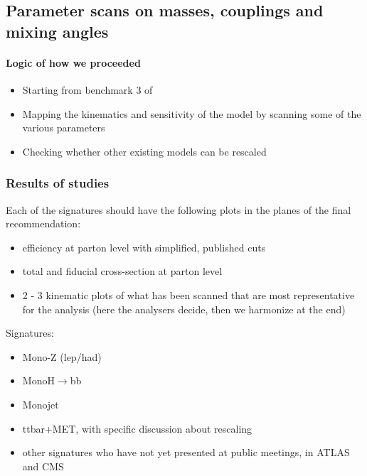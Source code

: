 \subsection{Parameter scans on masses, couplings and mixing angles}

\paragraph{Logic of how we proceeded}

\begin{itemize}
\item Starting from benchmark 3 of \cite{Bauer:2017ota}
\item Mapping the kinematics and sensitivity of the model by scanning some of the
various parameters
\item Checking whether other existing models can be rescaled
\end{itemize}

\subsubsection{Results of studies}

Each of the signatures should have the following plots in the planes
of the final recommendation: 
\begin{itemize} 
\item efficiency at parton level with simplified, published cuts
\item total and fiducial cross-section at parton level 
\item 2 - 3 kinematic plots of what has been scanned that are most representative for the analysis (here the analysers decide, then we harmonize at the end)
\end{itemize} 

Signatures:

\begin{itemize}

\item{Mono-Z (lep/had)}

\item{MonoH$\rightarrow$bb}

\item{Monojet}

\item{ttbar+MET}, with specific discussion about rescaling

\item{other signatures who have not yet presented at public meetings, in ATLAS and CMS}

\end{itemize}

